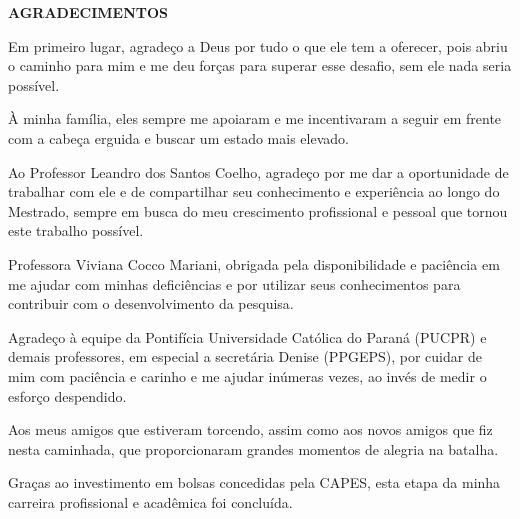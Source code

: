 \begin{center}
    \textbf{AGRADECIMENTOS}
\end{center}

Em primeiro lugar, agradeço a Deus por tudo o que ele tem a oferecer, pois abriu o caminho para mim e me deu forças para superar esse desafio, sem ele nada seria possível.

À minha família, eles sempre me apoiaram e me incentivaram a seguir em frente com a cabeça erguida e buscar um estado mais elevado.

Ao Professor Leandro dos Santos Coelho, agradeço por me dar a oportunidade de trabalhar com ele e de compartilhar seu conhecimento e experiência ao longo do Mestrado, sempre em busca do meu crescimento profissional e pessoal que tornou este trabalho possível.

Professora Viviana Cocco Mariani, obrigada pela disponibilidade e paciência em me ajudar com minhas deficiências e por utilizar seus conhecimentos para contribuir com o desenvolvimento da pesquisa.

Agradeço à equipe da Pontifícia Universidade Católica do Paraná (PUCPR) e demais professores, em especial a secretária Denise (PPGEPS), por cuidar de mim com paciência e carinho e me ajudar inúmeras vezes, ao invés de medir o esforço despendido.

Aos meus amigos que estiveram torcendo, assim como aos novos amigos que fiz nesta caminhada, que proporcionaram grandes momentos de alegria na batalha.

Graças ao investimento em bolsas concedidas pela CAPES, esta etapa da minha carreira profissional e acadêmica foi concluída.